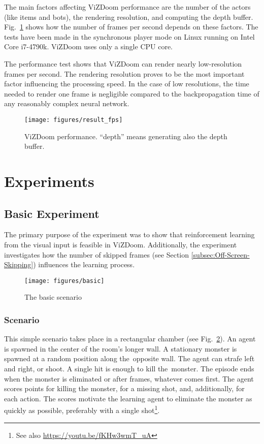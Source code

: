 \documentclass[english,american,conference, balance]{IEEEtran}
\begin{document}
The main factors affecting ViZDoom performance are the number of the
actors (like items and bots), the rendering resolution, and computing
the depth buffer. Fig.~\ref{fig:fps_test} shows how the number of
frames per second depends on these factors. The tests have been made
in the synchronous player mode on Linux running on Intel Core i7-4790k.
ViZDoom uses only a single CPU core.

The performance test shows that ViZDoom can render nearly 
low-resolution frames per second. The rendering resolution proves
to be the most important factor influencing the processing speed.
In the case of low resolutions, the time needed to render one frame
is negligible compared to the backpropagation time of any reasonably
complex neural network.

\begin{figure}
\centering{}\texttt{[image: figures/result\_fps]}
\caption{\label{fig:fps_test}ViZDoom performance. ``depth'' means generating
also the depth buffer.}
\end{figure}


\section{Experiments\label{sec:Experiment}}

\subsection{Basic Experiment}

The primary purpose of the experiment was to show that reinforcement
learning from the visual input is feasible in ViZDoom. Additionally,
the experiment investigates how the number of skipped frames (see
Section \ref{subsec:Off-Screen-Skipping}) influences the learning
process.

\begin{figure}
\centering{}\texttt{[image: figures/basic]}
\caption{\label{fig:basic}The basic scenario }
\end{figure}


\subsubsection{Scenario}

This simple scenario takes place in a rectangular chamber (see Fig.~\ref{fig:basic}).
An agent is spawned in the center of the room's longer wall. A stationary
monster is spawned at a random position along the~opposite wall.
The agent can strafe left and right, or shoot. A single hit is enough
to kill the~monster. The episode ends when the monster is eliminated
or after  frames, whatever comes first. The agent scores 
points for killing the monster,  for a missing shot, and, additionally,
 for each action. The scores motivate the learning agent to eliminate
the monster as quickly as possible, preferably with a single shot\footnote{See also \href{https://youtu.be/fKHw3wmT_uA}{https://youtu.be/fKHw3wmT\_{}uA}}.
\end{document}
